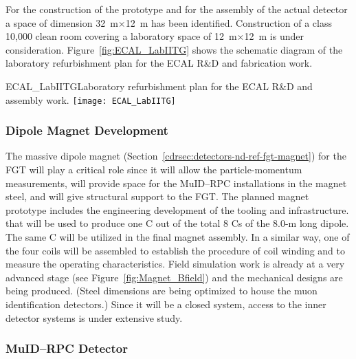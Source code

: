 For the construction of the prototype and for the assembly of the 
actual detector a
space of dimension 32~m$\times$12~m has been
identified. Construction of a class 10,000 clean room covering a
laboratory space of 12~m$\times$12~m is under consideration. %
Figure~\ref{fig:ECAL_LabIITG} shows the schematic diagram
of the laboratory refurbishment plan for the ECAL R\&D and fabrication
work.
\begin{cdrfigure}
{ECAL_LabIITG}{Laboratory refurbishment plan for the ECAL R\&D and assembly work.}
\texttt{[image: ECAL\_LabIITG]}
\end{cdrfigure}


\subsubsection{Dipole Magnet Development}

The massive dipole magnet (Section~\ref{cdrsec:detectors-nd-ref-fgt-magnet}) for the FGT will
play a critical role since it will allow the particle-momentum measurements, will 
provide space for the MuID--RPC installations in the magnet steel, 
and will give structural support to the FGT. 
The planned magnet prototype
includes the engineering development of the tooling and
infrastructure. 
that will be used to produce one C out of the total 8 Cs of the
8.0-m long dipole.  The same C will be utilized in the final magnet
assembly. In a similar way, one of the four coils %
will be assembled
 to establish the procedure of coil winding and to measure the
operating characteristics.  Field simulation work is already at a very
advanced stage (see Figure~\ref{fig:Magnet_Bfield}) and the mechanical
designs are being produced.  (Steel dimensions are being optimized to house the muon
identification detectors.) Since it will be a
closed system, access to the inner detector systems is under extensive
study. %


\subsubsection{MuID--RPC Detector}

